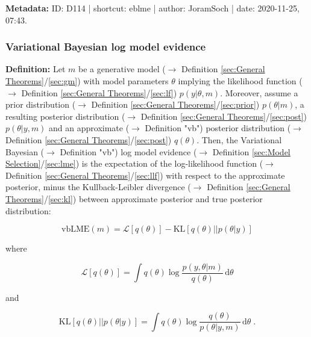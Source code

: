 \documentclass[a4paper,12pt,twoside]{book}
\begin{document}
\vspace{1em}
\textbf{Metadata:} ID: D114 | shortcut: eblme | author: JoramSoch | date: 2020-11-25, 07:43.
\vspace{1em}



\subsubsection[\textit{Variational Bayesian log model evidence}]{Variational Bayesian log model evidence} \label{sec:vblme}
\setcounter{equation}{0}

\textbf{Definition:} Let $m$ be a generative model ($\rightarrow$ Definition \ref{sec:General Theorems}/\ref{sec:gm}) with model parameters $\theta$ implying the likelihood function ($\rightarrow$ Definition \ref{sec:General Theorems}/\ref{sec:lf}) $p(y \vert \theta, m)$. Moreover, assume a prior distribution ($\rightarrow$ Definition \ref{sec:General Theorems}/\ref{sec:prior}) $p(\theta \vert m)$, a resulting posterior distribution ($\rightarrow$ Definition \ref{sec:General Theorems}/\ref{sec:post}) $p(\theta \vert y, m)$ and an approximate ($\rightarrow$ Definition "vb") posterior distribution ($\rightarrow$ Definition \ref{sec:General Theorems}/\ref{sec:post}) $q(\theta)$. Then, the Variational Bayesian ($\rightarrow$ Definition "vb") log model evidence ($\rightarrow$ Definition \ref{sec:Model Selection}/\ref{sec:lme}) is the expectation of the log-likelihood function ($\rightarrow$ Definition \ref{sec:General Theorems}/\ref{sec:llf}) with respect to the approximate posterior, minus the Kullback-Leibler divergence ($\rightarrow$ Definition \ref{sec:General Theorems}/\ref{sec:kl}) between approximate posterior and true posterior distribution:

\begin{equation} \label{eq:vblme-vbLME}
\mathrm{vbLME}(m) = \mathcal{L}\left[q(\theta)\right] - \mathrm{KL}\left[q(\theta) || p(\theta \vert y)\right]
\end{equation}

where

\begin{equation} \label{eq:vblme-ELL}
\mathcal{L}\left[q(\theta)\right] = \int q(\theta) \log \frac{p(y,\theta|m)}{q(\theta)} \, \mathrm{d}\theta
\end{equation}

and

\begin{equation} \label{eq:vblme-KL}
\mathrm{KL}\left[q(\theta) || p(\theta \vert y)\right] = \int q(\theta) \log \frac{q(\theta)}{p(\theta|y,m)} \, \mathrm{d}\theta  \; .
\end{equation}
\end{document}
